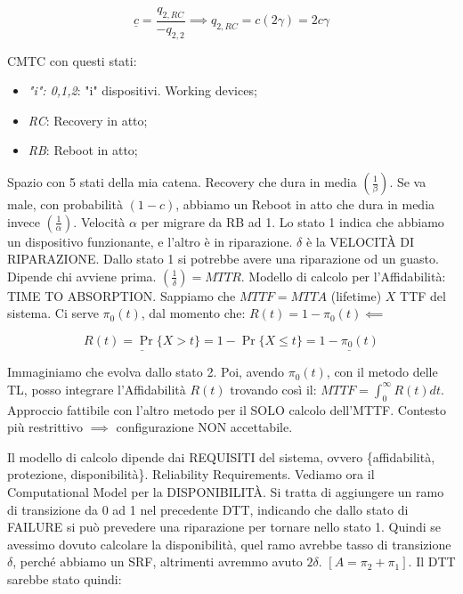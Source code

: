 \[	
	\underline{c} = \frac{q_{2,RC}}{-q_{2,2}} \implies q_{2,RC} = c(2\gamma) = 2c\gamma
\]

CMTC con questi stati:

\begin{itemize}

\item{\textit{"i": 0,1,2}}: "i" dispositivi. Working devices;
\item{\textit{RC}}: Recovery in atto;
\item{\textit{RB}}: Reboot in atto;

\end{itemize}

Spazio con 5 stati della mia catena. Recovery che dura in media $(\frac{1}{\beta})$. Se va male, con probabilità $(1-c)$, abbiamo un Reboot in atto che dura in media invece $(\frac{1}{\alpha})$. Velocità $\alpha$ per migrare da RB ad 1. Lo stato 1 indica che abbiamo un dispositivo funzionante, e l'altro è in riparazione. $\delta$ è la VELOCIT\`A DI RIPARAZIONE. Dallo stato 1 si potrebbe avere una riparazione od un guasto. Dipende chi avviene prima. $(\frac{1}{\delta}) = MTTR$. Modello di calcolo per l'Affidabilità: TIME TO ABSORPTION. Sappiamo che $MTTF=MTTA$ (lifetime) $X$ TTF del sistema. Ci serve $\pi_0(t)$, dal momento che: $R(t) = 1-\pi_0(t) \impliedby$

\[
	\underline{R(t) = \Pr\{X > t\}} = 1-\Pr\{X\leq t\} = \underline{1-\pi_0(t)}
\]

Immaginiamo che evolva dallo stato 2. Poi, avendo $\pi_0(t)$, con il metodo delle TL, posso integrare l'Affidabilità $R(t)$ trovando così il: $MTTF=\int_0^\infty{R(t)dt}$. Approccio fattibile con l'altro metodo per il SOLO calcolo dell'MTTF. Contesto più restrittivo $\implies$ configurazione NON accettabile.

Il modello di calcolo dipende dai REQUISITI del sistema, ovvero \{affidabilità, protezione, disponibilità\}. Reliability Requirements. Vediamo ora il Computational Model per la DISPONIBILIT\`A. Si tratta di aggiungere un ramo di transizione da 0 ad 1 nel precedente DTT, indicando che dallo stato di FAILURE si può prevedere una riparazione per tornare nello stato 1. Quindi se avessimo dovuto calcolare la disponibilità, quel ramo avrebbe tasso di transizione $\delta$, perché abbiamo un SRF, altrimenti avremmo avuto $2\delta$. $[A = \pi_2+\pi_1]$. Il DTT sarebbe stato quindi:

